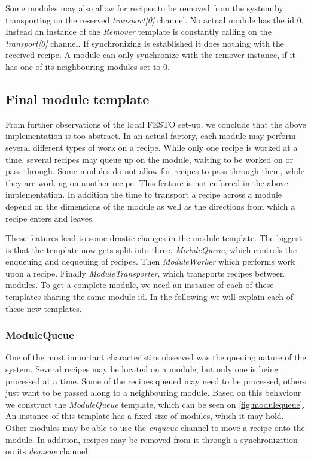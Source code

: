 Some modules may also allow for recipes to be removed from the system by transporting on the reserved \emph{transport[0]} channel. No actual module has the id 0. Instead an instance of the \emph{Remover} template is constantly calling on the \emph{transport[0]} channel. If synchronizing is established it does nothing with the received recipe. A module can only synchronize with the remover instance, if it has one of its neighbouring modules set to 0. 

\subsection{Final module template}
From further observations of the local FESTO set-up, we conclude that the above implementation is too abstract. In an actual factory, each module may perform several different types of work on a recipe. While only one recipe is worked at a time, several recipes may queue up on the module, waiting to be worked on or pass through. Some modules do not allow for recipes to pass through them, while they are working on another recipe. This feature is not enforced in the above implementation. In addition the time to transport a recipe across a module depend  on the dimensions of the module as well as the directions from which a recipe enters and leaves.

These features lead to some drastic changes in the module template. The biggest is that the template now gets split into three. \emph{ModuleQueue}, which controls the enqueuing and dequeuing of recipes. Then \emph{ModuleWorker} which performs work upon a recipe. Finally \emph{ModuleTransporter}, which transports recipes between modules. To get a complete module, we need an instance of each of these templates sharing the same module id. In the following we will explain each of these new templates.


\subsubsection{ModuleQueue}\label{subs:modulequeue}
One of the most important characteristics observed was the queuing nature of the system. Several recipes may be located on a module, but only one is being processed at a time. Some of the recipes queued may need to be processed, others just want to be passed along to a neighbouring module. Based on this behaviour we construct the \emph{ModuleQueue} template, which can be seen on \cref{fig:modulequeue}. An instance of this template has a fixed size of modules, which it may hold. Other modules may be able to use the \emph{enqueue} channel to move a recipe onto the module. In addition, recipes may be removed from it through a synchronization on its \emph{dequeue} channel.

